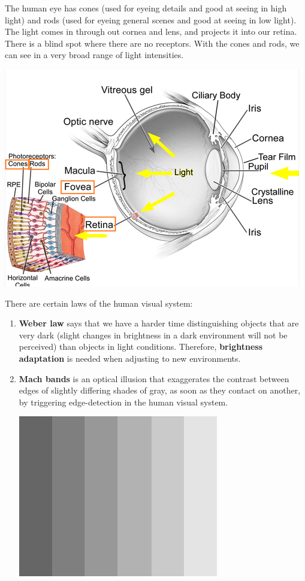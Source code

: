 \documentclass{article}
\begin{document}
    The human eye has cones (used for eyeing details and good at seeing in high light) and rods (used for eyeing general scenes and good at seeing in low light). The light comes in through out cornea and lens, and projects it into our retina. There is a blind spot where there are no receptors. With the cones and rods, we can see in a very broad range of light intensities. 
    \begin{center}
        \includegraphics[scale=0.4]{img/eye_diagram.png}
    \end{center}
    There are certain laws of the human visual system: 
    \begin{enumerate}
        \item \textbf{Weber law} says that we have a harder time distinguishing objects that are very dark (slight changes in brightness in a dark environment will not be perceived) than objects in light conditions. Therefore, \textbf{brightness adaptation} is needed when adjusting to new environments. 
        
        \item \textbf{Mach bands} is an optical illusion that exaggerates the contrast between edges of slightly differing shades of gray, as soon as they contact on another, by triggering edge-detection in the human visual system. 
        \begin{center}
            \includegraphics[scale=0.4]{img/mach_bands.png}
        \end{center}
    \end{enumerate}
\end{document}
